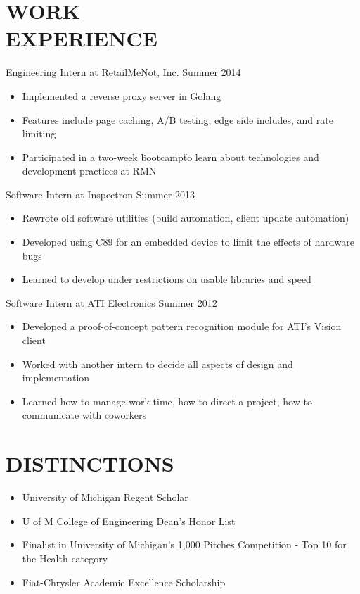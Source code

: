 \documentclass[line,margin]{res}
\begin{document}
\begin{resume}
\section{\textcolor{HeaderColor}{WORK \\ EXPERIENCE}} 
                {\sc Engineering Intern at RetailMeNot, Inc.} \hfill Summer 2014
                 \begin{itemize}  \itemsep -2pt %
                 \item Implemented a reverse proxy server in Golang
                 \item Features include page caching, A/B testing, edge side includes, and rate limiting
                 \item Participated in a two-week \"bootcamp\" to learn about technologies and development practices at RMN
                 \end{itemize}

                {\sc Software Intern at Inspectron} \hfill Summer 2013
                 \begin{itemize}  \itemsep -2pt %
                 \item Rewrote old software utilities (build automation, client update automation)
                 \item Developed using C89 for an embedded device to limit the effects of hardware bugs
                 \item Learned to develop under restrictions on usable libraries and speed
                 \end{itemize}
 
                {\sc Software Intern at ATI Electronics} \hfill            Summer 2012
                 \begin{itemize}  \itemsep -2pt %
                 \item Developed a proof-of-concept pattern recognition module for ATI’s Vision client
                 \item Worked with another intern to decide all aspects of design and implementation
                 \item Learned how to manage work time, how to direct a project, how to communicate with coworkers
                 \end{itemize} 

\section{\textcolor{HeaderColor}{DISTINCTIONS}}
    \begin{itemize} \itemsep-0.2em
    \item University of Michigan Regent Scholar
    \item U of M College of Engineering Dean’s Honor List
    \item Finalist in University of Michigan’s 1,000 Pitches Competition - Top 10 for the Health category
    \item Fiat-Chrysler Academic Excellence Scholarship
    \end{itemize}
 

\end{resume}
\end{document}
